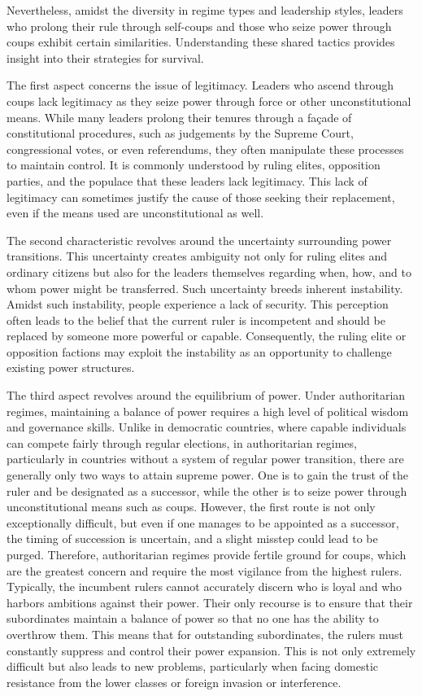 \documentclass[
  12pt,
  a4paper,
  12pt]{article}
\begin{document}
Nevertheless, amidst the diversity in regime types and leadership
styles, leaders who prolong their rule through self-coups and those who
seize power through coups exhibit certain similarities. Understanding
these shared tactics provides insight into their strategies for
survival.

The first aspect concerns the issue of legitimacy. Leaders who ascend
through coups lack legitimacy as they seize power through force or other
unconstitutional means. While many leaders prolong their tenures through
a façade of constitutional procedures, such as judgements by the Supreme
Court, congressional votes, or even referendums, they often manipulate
these processes to maintain control. It is commonly understood by ruling
elites, opposition parties, and the populace that these leaders lack
legitimacy. This lack of legitimacy can sometimes justify the cause of
those seeking their replacement, even if the means used are
unconstitutional as well.

The second characteristic revolves around the uncertainty surrounding
power transitions. This uncertainty creates ambiguity not only for
ruling elites and ordinary citizens but also for the leaders themselves
regarding when, how, and to whom power might be transferred. Such
uncertainty breeds inherent instability. Amidst such instability, people
experience a lack of security. This perception often leads to the belief
that the current ruler is incompetent and should be replaced by someone
more powerful or capable. Consequently, the ruling elite or opposition
factions may exploit the instability as an opportunity to challenge
existing power structures.

The third aspect revolves around the equilibrium of power. Under
authoritarian regimes, maintaining a balance of power requires a high
level of political wisdom and governance skills. Unlike in democratic
countries, where capable individuals can compete fairly through regular
elections, in authoritarian regimes, particularly in countries without a
system of regular power transition, there are generally only two ways to
attain supreme power. One is to gain the trust of the ruler and be
designated as a successor, while the other is to seize power through
unconstitutional means such as coups. However, the first route is not
only exceptionally difficult, but even if one manages to be appointed as
a successor, the timing of succession is uncertain, and a slight misstep
could lead to be purged. Therefore, authoritarian regimes provide
fertile ground for coups, which are the greatest concern and require the
most vigilance from the highest rulers. Typically, the incumbent rulers
cannot accurately discern who is loyal and who harbors ambitions against
their power. Their only recourse is to ensure that their subordinates
maintain a balance of power so that no one has the ability to overthrow
them. This means that for outstanding subordinates, the rulers must
constantly suppress and control their power expansion. This is not only
extremely difficult but also leads to new problems, particularly when
facing domestic resistance from the lower classes or foreign invasion or
interference.
\end{document}
